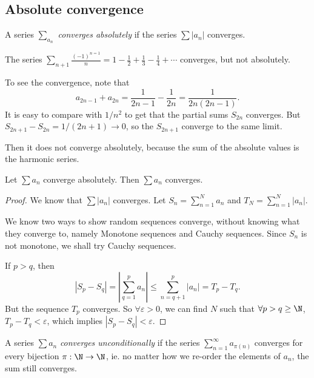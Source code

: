 \documentclass[a4paper]{article}
\begin{document}
\subsection{Absolute convergence}
\begin{defi}
  A series $\sum_{a_n}$ \emph{converges absolutely} if the series $\sum |a_n|$ converges.
\end{defi}

\begin{eg}
  The series $\sum_{n + 1}\frac{(-1)^{n = 1}}{n} = 1 - \frac{1}{2} + \frac{1}{3} - \frac{1}{4} + \cdots$ converges, but not absolutely.

  To see the convergence, note that
  \[
    a_{2n - 1} + a_{2n} = \frac{1}{2n - 1} - \frac{1}{2n} = \frac{1}{2n(2n- 1)}.
  \]
  It is easy to compare with $1/n^2$ to get that the partial sums $S_{2n}$ converges. But $S_{2n + 1} - S_{2n} = 1/(2n + 1) \to 0$, so the $S_{2n + 1}$ converge to the same limit.

  Then it does not converge absolutely, because the sum of the absolute values is the harmonic series.
\end{eg}

\begin{lemma}
  Let $\sum a_n$ converge absolutely. Then $\sum a_n$ converges.
\end{lemma}

\begin{proof}
  We know that $\sum |a_n|$ converges. Let $S_n = \sum_{n = 1}^N a_n$ and $T_N = \sum_{n = 1}^N |a_n|$.

  We know two ways to show random sequences converge, without knowing what they converge to, namely Monotone sequences and Cauchy sequences. Since $S_n$ is not monotone, we shall try Cauchy sequences.

  If $p > q$, then
  \[
    |S_p - S_q| = \left|\sum_{q = 1}^p a_n\right| \leq \sum_{n = q + 1}^p |a_n| = T_p - T_q.
  \]
  But the sequence $T_p$ converges. So $\forall \varepsilon > 0$, we can find $N$ such that $\forall p > q \geq \N$, $T_p - T_q < \varepsilon$, which implies $|S_p - S_q| < \varepsilon$.
\end{proof}

\begin{defi}
  A series $\sum a_n$ \emph{converges unconditionally} if the series $\sum_{n = 1}^{\infty} a_{\pi(n)}$ converges for every bijection $\pi: \N \to \N$, ie. no matter how we re-order the elements of $a_n$, the sum still converges.
\end{defi}
\end{document}
